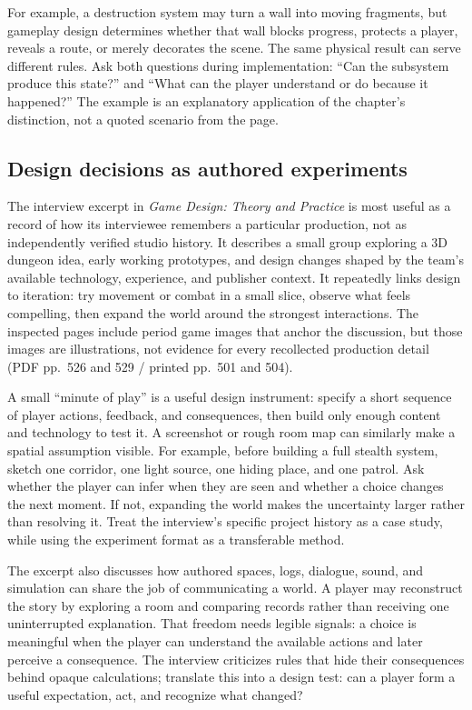 For example, a destruction system may turn a wall into moving fragments, but gameplay design determines whether that wall blocks progress, protects a player, reveals a route, or merely decorates the scene. The same physical result can serve different rules. Ask both questions during implementation: ``Can the subsystem produce this state?'' and ``What can the player understand or do because it happened?'' The example is an explanatory application of the chapter's distinction, not a quoted scenario from the page.

\subsection{Design decisions as authored experiments}\label{05-engine-i-ch009-design-decisions-as-authored-experiments}

\hypertarget{05-engine-i-ch009-design-decisions-as-authored-experiments}{}

The interview excerpt in \emph{Game Design: Theory and Practice} is most useful as a record of how its interviewee remembers a particular production, not as independently verified studio history. It describes a small group exploring a 3D dungeon idea, early working prototypes, and design changes shaped by the team's available technology, experience, and publisher context. It repeatedly links design to iteration: try movement or combat in a small slice, observe what feels compelling, then expand the world around the strongest interactions. The inspected pages include period game images that anchor the discussion, but those images are illustrations, not evidence for every recollected production detail (PDF pp.~526 and 529 / printed pp.~501 and 504).

A small ``minute of play'' is a useful design instrument: specify a short sequence of player actions, feedback, and consequences, then build only enough content and technology to test it. A screenshot or rough room map can similarly make a spatial assumption visible. For example, before building a full stealth system, sketch one corridor, one light source, one hiding place, and one patrol. Ask whether the player can infer when they are seen and whether a choice changes the next moment. If not, expanding the world makes the uncertainty larger rather than resolving it. Treat the interview's specific project history as a case study, while using the experiment format as a transferable method.

The excerpt also discusses how authored spaces, logs, dialogue, sound, and simulation can share the job of communicating a world. A player may reconstruct the story by exploring a room and comparing records rather than receiving one uninterrupted explanation. That freedom needs legible signals: a choice is meaningful when the player can understand the available actions and later perceive a consequence. The interview criticizes rules that hide their consequences behind opaque calculations; translate this into a design test: can a player form a useful expectation, act, and recognize what changed?

